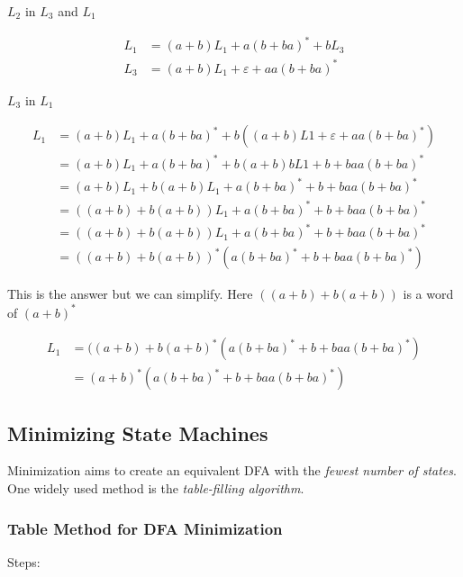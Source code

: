 \(L_2\) in \(L_3\) and \(L_1\) 

\begin{align*}
    L_1 &= (a+b)L_1 + a(b + ba)^* +bL_3\\
    L_3 &= (a+b)L_1 + \varepsilon + aa(b + ba)^* 
\end{align*}

\(L_3\) in  \(L_1\)

\begin{align*}
    L_1 &= (a+b)L_1 + a(b + ba)^* +b((a+b)L1 + \varepsilon + aa(b + ba)^*)\\
        &= (a+b)L_1 + a(b + ba)^* +b(a+b)bL1 + b + baa(b + ba)^*\\
        &= (a+b)L_1  + b(a+b)L_1 + a(b + ba)^* + b + baa(b + ba)^*\\
        &= ((a+b)  + b(a+b))L_1 + a(b + ba)^* + b + baa(b + ba)^*\\
        &= ((a+b)  + b(a+b))L_1 + a(b + ba)^* + b + baa(b + ba)^*\\
        &= ((a+b)  + b(a+b))^*(a(b + ba)^* + b + baa(b + ba)^*)
\end{align*}

This is the answer but we can simplify. Here \(((a+ b) + b(a+b))\) is a word of \((a+b)^*\)

\begin{align*}
    L_1 &= ((a+b)  + b(a + b)^*(a(b + ba)^* + b + baa(b + ba)^*) \\
        &= (a+b)^* (a(b + ba)^* + b + baa(b + ba)^*)
\end{align*}

\subsection{Minimizing State Machines}

Minimization aims to create an equivalent DFA with the \emph{fewest number of states}. One widely used 
method is the \emph{table-filling algorithm}.

\subsubsection{Table Method for DFA Minimization}

Steps:


